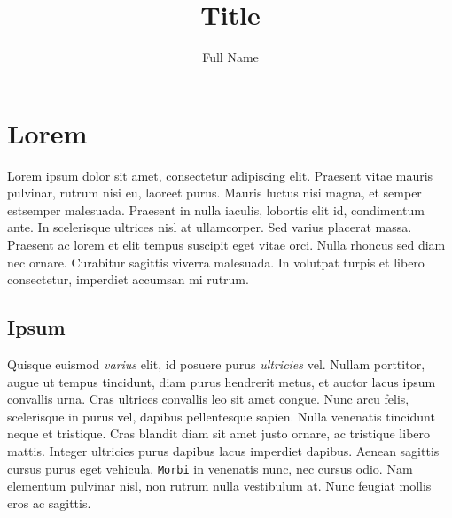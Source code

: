 \documentclass[a4paper,12pt]{article}
\title{Title}
\author{Full Name}
\date{}
\begin{document}




\pagestyle{empty}
\renewcommand{\contentsname}{\centering Contents}
\tableofcontents
\newpage



\pagestyle{fancy}
\cfoot{\thepage}
\rhead{}
\renewcommand{\headrulewidth}{0pt}
\renewcommand{\headheight}{14.5pt}
\renewcommand{\footrulewidth}{0.4pt}



\section{Lorem}

Lorem ipsum dolor sit amet, consectetur adipiscing elit. Praesent vitae mauris 
pulvinar, rutrum nisi eu, laoreet purus. Mauris luctus nisi magna, et semper 
estsemper malesuada. Praesent in nulla iaculis, lobortis elit id, condimentum 
ante. In scelerisque ultrices nisl at ullamcorper. Sed varius placerat massa. 
Praesent ac lorem et elit tempus suscipit eget vitae orci. Nulla rhoncus sed 
diam nec ornare. Curabitur sagittis viverra malesuada. In volutpat turpis et 
libero consectetur, imperdiet accumsan mi rutrum.

\subsection{Ipsum}
Quisque euismod \emph{varius} elit, id posuere purus \emph{ultricies} vel. 
Nullam porttitor, augue ut tempus tincidunt, diam purus hendrerit metus, 
et auctor lacus ipsum convallis urna. Cras ultrices convallis leo sit amet 
congue. Nunc arcu felis, scelerisque in purus vel, dapibus pellentesque sapien. 
Nulla venenatis tincidunt neque et tristique. Cras blandit diam sit amet justo 
ornare, ac tristique libero mattis. Integer ultricies purus dapibus lacus 
imperdiet dapibus. Aenean sagittis cursus purus eget vehicula. 
\texttt{Morbi} in venenatis nunc, nec cursus odio. Nam elementum pulvinar 
nisl, non rutrum nulla vestibulum at. Nunc feugiat mollis eros ac sagittis.
\end{document}
